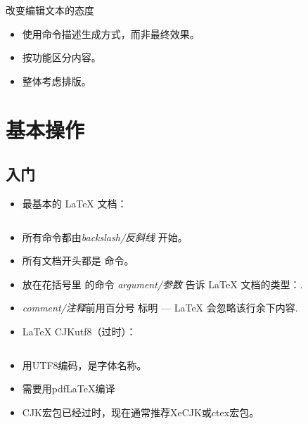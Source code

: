 \documentclass{beamer}
\begin{document}
\begin{frame}[fragile]{改变编辑文本的态度}

\begin{itemize}
\item 使用命令描述生成方式，而非最终效果。
\item 按功能区分内容。
\item 整体考虑排版。
\end{itemize}
\end{frame}

\section{基本操作}

\subsection{入门}
\begin{frame}[fragile]{\insertsubsection}
\begin{itemize}
\item 最基本的 \LaTeX{} 文档：
\inputminted[frame=single]{latex}{basics.tex}
\item 所有命令都由\emph{backslash/反斜线} \keystrokebftt{\bs}开始。
\item 所有文档开头都是 命令。
\item 放在花括号里 \keystrokebftt{\{} \keystrokebftt{\}} 的命令 \emph{argument/参数} 告诉 \LaTeX{} 文档的类型：.
\item \emph{comment/注释}前用百分号 \keystrokebftt{\%} 标明 --- \LaTeX{}
会忽略该行余下内容.
\end{itemize}
\end{frame}

\begin{frame}[fragile]{\insertsubsection}
\begin{itemize}
\item \LaTeX{} CJKutf8（过时）：
\inputminted[frame=single]{latex}{basics-zh-cn.tex}
\item {}用UTF8编码，是字体名称。
\item 需要用pdfLaTeX编译
\item CJK宏包已经过时，现在通常推荐XeCJK或ctex宏包。
\end{itemize} 
\end{frame}
\end{document}
